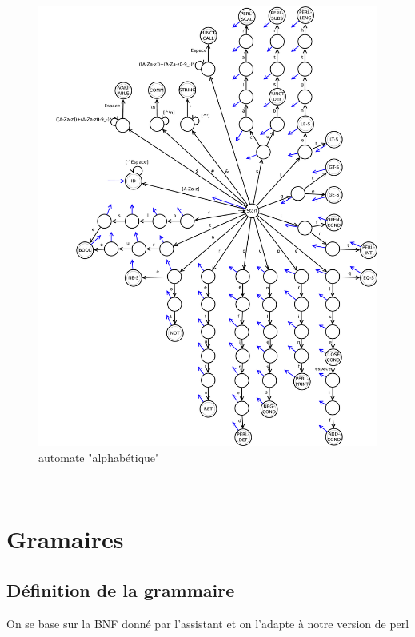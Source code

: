 \documentclass[a4paper,10pt]{article}
\begin{document}
  \begin{figure}[H] \hspace*{-2cm} 
    \centering
   	  \includegraphics[width=450pt]{automate2.pdf} 
			\caption{automate "alphabétique"}
			\label{automate2}
  \end{figure}	

\pagebreak
~\\

\section{Gramaires}

\subsection{Définition de la grammaire}

On se base sur la BNF donné par l'assistant et on l'adapte à notre version de perl
\end{document}
